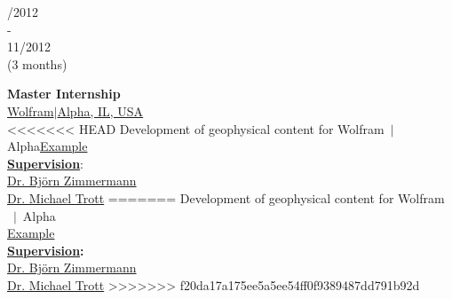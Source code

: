 \documentclass{article}
\begin{document}
\begin{minipage}[t]{0.69\textwidth}
\begin{minipage}{0.34\textwidth}
\begin{minipage}[t]{0.7\textwidth}
\begin{minipage}[t]{0.45\textwidth}
		
		
		\begin{minipage}[t]{0.25\textwidth}
		/2012\\ -\\ 11/2012 \\(3 months)
		\end{minipage}		
		\hfill
		\begin{minipage}[t]{0.75\textwidth}
		\textbf{Master Internship}\\
		\href{https:///www.wolframalpha.com/}{\color{pblue}Wolfram$\mid$Alpha, IL, USA}\\
<<<<<<< HEAD
	   Development of geophysical content for Wolfram$~\mid~$Alpha\hfill \href{https://m.wolframalpha.com/input/?i=moment+magnitude}{\color{pblue}Example}\\
	    \textbf{\underline{Supervision}}:\\ \href{mailto:bjornz@wolfram.com }{Dr. Björn Zimmermann} \\ \href{mailto:mtrott@wolfram.com }{Dr. Michael Trott} 
=======
	   Development of geophysical content for Wolfram$~\mid~$Alpha\\
	    \href{https://m.wolframalpha.com/input/?i=moment+magnitude}{\color{pblue}Example}\\
	     \textbf{\underline{Supervision}:}\\
	     \href{mailto:bjornz@wolfram.com }{\color{pblue} Dr. Björn Zimmermann} \\ \href{mailto:mtrott@wolfram.com }{\color{pblue} Dr. Michael Trott} 
>>>>>>> f20da17a175ee5a5ee54ff0f9389487dd791b92d
		\end{minipage}
		\vspace{0.3cm}
		

\end{minipage}
\end{minipage}
\end{minipage}
\end{minipage}
\end{document}
